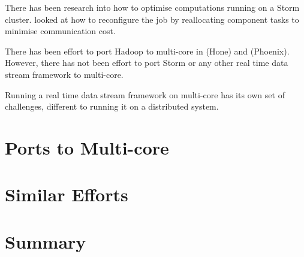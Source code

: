 There has been research into how to optimise computations running on a Storm cluster. \cite{Chatzistergiou:2014:FHN:2661829.2661882} looked at how to reconfigure the job by reallocating component tasks to minimise communication cost. 

There has been effort to port Hadoop to multi-core in \cite{Kumar:2013:HSD:2536274.2536314} (Hone) and \cite{ranger2007evaluating} (Phoenix). However, there has not been effort to port Storm or any other real time data stream framework to multi-core.

Running a real time data stream framework on multi-core has its own set of challenges, different to running it on a distributed system. 


\section{Ports to Multi-core}

\section{Similar Efforts}




\section{Summary}